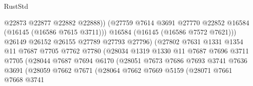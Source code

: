 \begin{lexlean}{RustStd}
\begin{coremodule}
                                        @22873
                                        @22877
                                        @22882
                                        @22888))
                                    (@27759
                                      @7614
                                      @3691
                                      @27770
                                      @22852
                                      @16584
                                      (@16145 (@16586 @7615 @3711)))
                                    @16584
                                    (@16145 (@16586 @7572 @7621)))
                                  @26149
                                  @26152
                                  @26155
                                  @27789
                                  @27793
                                  @27796)
                                (@27802
                                  @7631
                                  @1331
                                  @1354
                                  @11
                                  @7687
                                  @7705
                                  @7762
                                  @7780
                                  (@28034
                                    @1319
                                    @1330
                                    @11
                                    @7687
                                    @7696
                                    @3711
                                    @7705
                                    (@28044
                                      @7687
                                      @7694
                                      @6170
                                      (@28051
                                        @7673
                                        @7686
                                        @7693
                                        @3741
                                        @7636
                                        @3691
                                        (@28059
                                          @7662
                                          @7671
                                          (@28064
                                            @7662
                                            @7669
                                            @5159
                                            (@28071
                                              @7661
                                              @7668
                                              @3741

\end{coremodule}
\end{lexlean}
